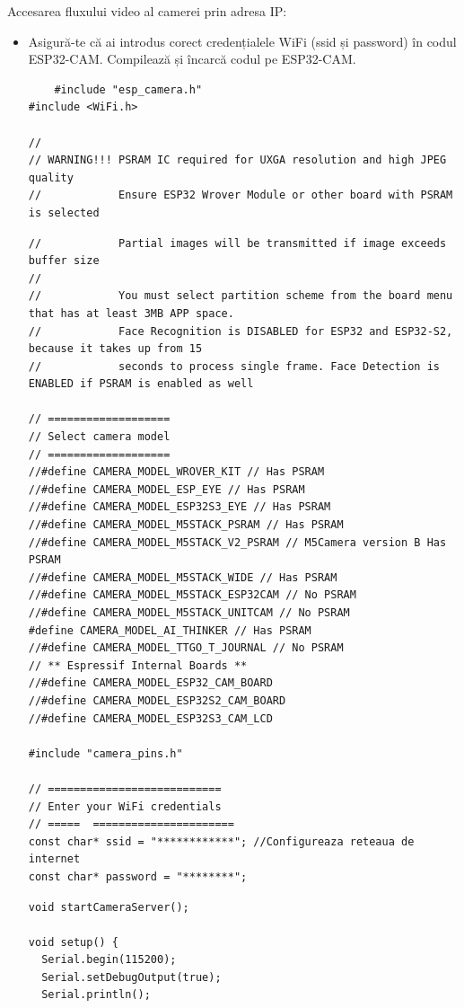 \documentclass{report}
\begin{document}
\begin{enumerate}
Accesarea fluxului video al camerei prin adresa IP:
\begin{itemize}
    \item Asigură-te că ai introdus corect credențialele WiFi (ssid și password) în codul ESP32-CAM. Compilează și încarcă codul pe ESP32-CAM.
\begin{lstlisting}
    #include "esp_camera.h"
#include <WiFi.h>

//
// WARNING!!! PSRAM IC required for UXGA resolution and high JPEG quality
//            Ensure ESP32 Wrover Module or other board with PSRAM is selected
\end{lstlisting}
\vspace*{1cm}
\begin{lstlisting}
//            Partial images will be transmitted if image exceeds buffer size
//
//            You must select partition scheme from the board menu that has at least 3MB APP space.
//            Face Recognition is DISABLED for ESP32 and ESP32-S2, because it takes up from 15 
//            seconds to process single frame. Face Detection is ENABLED if PSRAM is enabled as well

// ===================
// Select camera model
// ===================
//#define CAMERA_MODEL_WROVER_KIT // Has PSRAM
//#define CAMERA_MODEL_ESP_EYE // Has PSRAM
//#define CAMERA_MODEL_ESP32S3_EYE // Has PSRAM
//#define CAMERA_MODEL_M5STACK_PSRAM // Has PSRAM
//#define CAMERA_MODEL_M5STACK_V2_PSRAM // M5Camera version B Has PSRAM
//#define CAMERA_MODEL_M5STACK_WIDE // Has PSRAM
//#define CAMERA_MODEL_M5STACK_ESP32CAM // No PSRAM
//#define CAMERA_MODEL_M5STACK_UNITCAM // No PSRAM
#define CAMERA_MODEL_AI_THINKER // Has PSRAM
//#define CAMERA_MODEL_TTGO_T_JOURNAL // No PSRAM
// ** Espressif Internal Boards **
//#define CAMERA_MODEL_ESP32_CAM_BOARD
//#define CAMERA_MODEL_ESP32S2_CAM_BOARD
//#define CAMERA_MODEL_ESP32S3_CAM_LCD

#include "camera_pins.h"

// ===========================
// Enter your WiFi credentials
// =====  ======================
const char* ssid = "************"; //Configureaza reteaua de internet
const char* password = "********";
\end{lstlisting}
\vspace*{1cm}
\begin{lstlisting}
void startCameraServer();

void setup() {
  Serial.begin(115200);
  Serial.setDebugOutput(true);
  Serial.println();


\end{lstlisting}
\end{itemize}
\end{enumerate}
\end{document}
